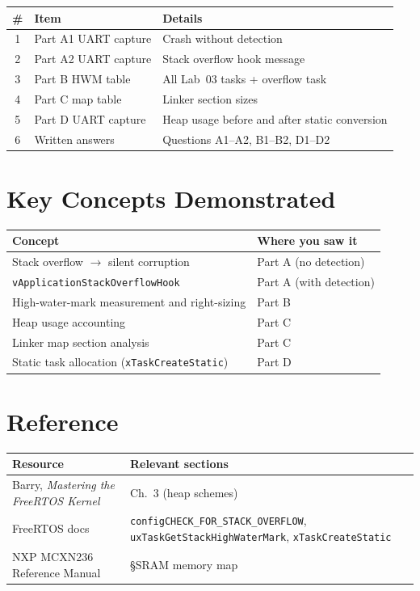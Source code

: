 \documentclass[11pt, a4paper]{article}
\begin{document}
\renewcommand{\arraystretch}{1.3}
\begin{tabular}{@{} c p{4.5cm} p{7cm} @{}}
  \toprule
  \textbf{\#} & \textbf{Item} & \textbf{Details} \\
  \midrule
  1 & Part A1 UART capture  & Crash without detection \\
  2 & Part A2 UART capture  & Stack overflow hook message \\
  3 & Part B HWM table      & All Lab~03 tasks + overflow task \\
  4 & Part C map table      & Linker section sizes \\
  5 & Part D UART capture   & Heap usage before and after static conversion \\
  6 & Written answers       & Questions A1--A2, B1--B2, D1--D2 \\
  \bottomrule
\end{tabular}
\renewcommand{\arraystretch}{1}

\section{Key Concepts Demonstrated}

\renewcommand{\arraystretch}{1.3}
\begin{tabular}{@{} p{7cm} p{6cm} @{}}
  \toprule
  \textbf{Concept} & \textbf{Where you saw it} \\
  \midrule
  Stack overflow $\to$ silent corruption       & Part A (no detection) \\
  \texttt{vApplicationStackOverflowHook}       & Part A (with detection) \\
  High-water-mark measurement and right-sizing & Part B \\
  Heap usage accounting                        & Part C \\
  Linker map section analysis                  & Part C \\
  Static task allocation (\texttt{xTaskCreateStatic}) & Part D \\
  \bottomrule
\end{tabular}
\renewcommand{\arraystretch}{1}

\section{Reference}

\renewcommand{\arraystretch}{1.3}
\begin{tabular}{@{} p{5.5cm} p{7.5cm} @{}}
  \toprule
  \textbf{Resource} & \textbf{Relevant sections} \\
  \midrule
  Barry, \textit{Mastering the FreeRTOS Kernel} & Ch.~3 (heap schemes) \\
  FreeRTOS docs &
    \texttt{configCHECK\_FOR\_STACK\_OVERFLOW},
    \texttt{uxTaskGetStackHighWaterMark},
    \texttt{xTaskCreateStatic} \\
  NXP MCXN236 Reference Manual & \S SRAM memory map \\
  \bottomrule
\end{tabular}
\renewcommand{\arraystretch}{1}
\end{document}
